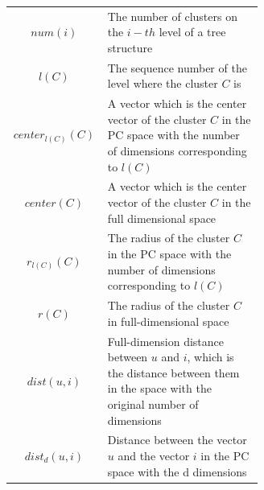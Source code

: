 \begin{table}[t]
\begin{tabular}{|c|p{0.62\linewidth}|}
$num(i)$ & The number of clusters on the $i-th$ level of a tree structure\\

$l(C)$ & The sequence number of the level where the cluster $C$ is\\


$center_{l(C)}(C)$ & A vector which is the center vector of the cluster $C$ in the PC space with the number of dimensions corresponding to $l(C)$\\

$center(C)$ & A vector which is the center vector of the cluster $C$ in the full dimensional space\\

$r_{l(C)}(C)$ & The radius of the cluster $C$ in the PC space with the number of dimensions corresponding to $l(C)$\\

$r(C)$ & The radius of the cluster $C$ in full-dimensional space\\

$dist(u,i)$ & Full-dimension distance between $u$ and $i$, which is the distance between them in the space with the original number of dimensions\\

$dist_{d}(u,i)$ & Distance between the vector $u$ and the vector $i$ in the PC space with the d dimensions\\




\end{tabular}
\end{table}
